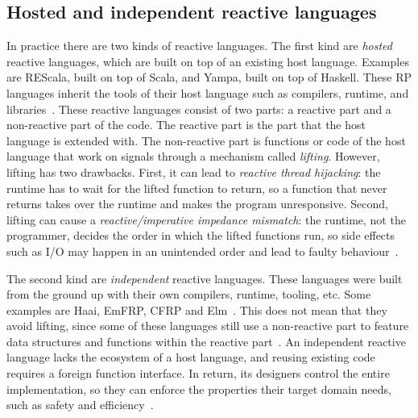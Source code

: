 \documentclass[a4paper]{book}
\begin{document}
\subsection{Hosted and independent reactive languages}
\label{sec:hosted-and-independent-reactive-languages}
In practice there are two kinds of reactive languages. The first kind are
\emph{hosted} reactive languages, which are built on top of an existing host
language. Examples are REScala, built on top of Scala, and Yampa, built on top
of Haskell. These RP languages inherit the tools of their host language such as
compilers, runtime, and libraries~\cite{surveyRP2024}. These reactive languages
consist of two parts: a reactive part and a non-reactive part of the code. The
reactive part is the part that the host language is extended with. The
non-reactive part is functions or code of the host language that work on signals
through a mechanism called \emph{lifting}. However, lifting has two drawbacks.
First, it can lead to \emph{reactive thread hijacking}: the runtime has to wait
for the lifted function to return, so a function that never returns takes over
the runtime and makes the program unresponsive. Second, lifting can cause a
\emph{reactive/imperative impedance mismatch}: the runtime, not the programmer,
decides the order in which the lifted functions run, so side effects such as I/O
may happen in an unintended order and lead to faulty
behaviour~\cite{oeyen2024reactive}.


The second kind are \emph{independent} reactive languages. These languages were
built from the ground up with their own compilers, runtime, tooling, etc. Some
examples are Haai, EmFRP, CFRP and Elm~\cite{surveyRP2024}. This does not mean
that they avoid lifting, since some of these languages still use a non-reactive
part to feature data structures and functions within the reactive
part~\cite{surveyRP2024}. An independent reactive language lacks the ecosystem
of a host language, and reusing existing code requires a foreign function
interface. In return, its designers control the entire implementation, so they
can enforce the properties their target domain needs, such as safety and
efficiency~\cite{surveyRP2024}.
\end{document}
